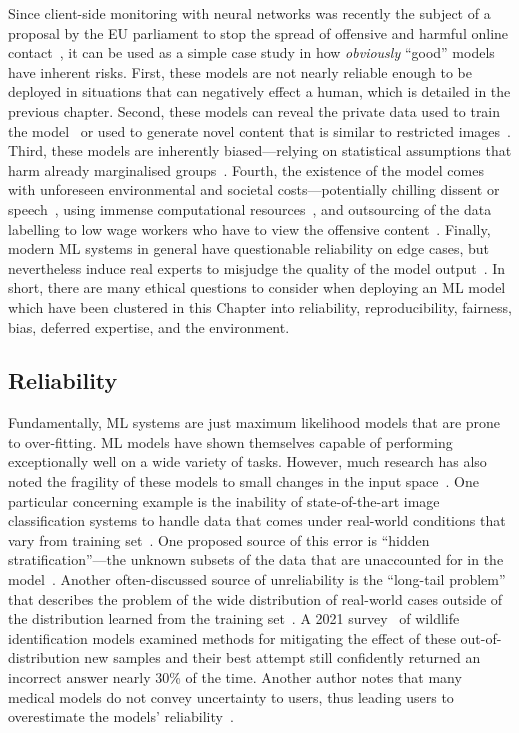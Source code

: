 Since client-side monitoring with neural networks was recently the subject of a proposal by the EU parliament to stop the spread of offensive and harmful online contact~\cite{chat_control}, it can be used as a simple case study in how \textit{obviously} ``good'' models have inherent risks.
First, these models are not nearly reliable enough to be deployed in situations that can negatively effect a human, which is detailed in the previous chapter. 
Second, these models can reveal the private data used to train the model~\cite{extraction_attack} or used to generate novel content that is similar to restricted images~\cite{zhong2020towards}.
Third, these models are inherently biased---relying on statistical assumptions that harm already marginalised groups~\cite{buolamwini2018gender}. 
Fourth, the existence of the model comes with unforeseen environmental and societal costs---potentially chilling dissent or speech~\cite{abelson2021bugs}, using immense computational resources~\cite{ai_power}, and outsourcing of the data labelling to low wage workers who have to view the offensive content~\cite{ai_inequity}.
Finally, modern ML systems in general have questionable reliability on edge cases, but nevertheless induce real experts to misjudge the quality of the model output~\cite{chatgptlawyer,teslasleep1,teslasleep2,teslasleep3,perry2023users,rosenbacke2024ai}.
In short, there are many ethical questions to consider when deploying an ML model which have been clustered in this Chapter into reliability, reproducibility, fairness,  bias, deferred expertise, and the environment.


\subsection{Reliability}
\label{subsec:reliability}
Fundamentally, ML systems are just maximum likelihood models that are prone to over-fitting.
ML models have shown themselves capable of performing exceptionally well on a wide variety of tasks. 
However, much research has also noted the fragility of these models to small changes in the input space~\cite{fgm,carlini_towards_2017,madry2017towards,deepfool,hopskipjump,deepfool,pixelattack}. 
One particular concerning example is the inability of state-of-the-art image classification systems to handle data that comes under real-world conditions that vary from training set~\cite{bungert2023understanding,azarpromise}. 
One proposed source of this error is ``hidden stratification''---the unknown subsets of the data that are unaccounted for in the model~\cite{hidden_stratification}.
Another often-discussed source of unreliability is the ``long-tail problem'' that describes the problem of the wide distribution of real-world cases outside of the  distribution learned from the training set~\cite{zhang2023deep}.
A 2021 survey~\cite{koh2021wilds} of wildlife identification models examined methods for mitigating the effect of these out-of-distribution new samples and their best attempt still confidently returned an incorrect answer nearly 30\% of the time.
Another author notes that many medical models do not convey uncertainty to users, thus leading users to overestimate the models' reliability~\cite{medical_failure_detection}.

